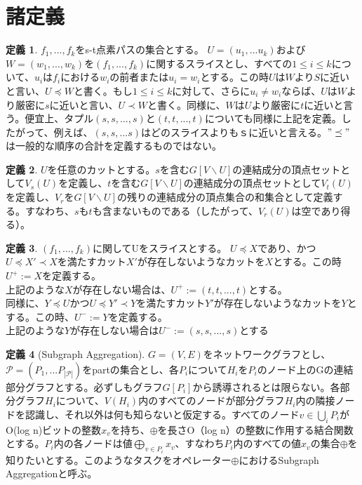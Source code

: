\documentclass{jarticle}
\theoremstyle{definition}
\newtheorem{definition}{定義}
\begin{document}
\section*{諸定義}
\begin{definition}
  ${f_1,...,f_k}$をs-t点素パスの集合とする。
  $U=(u_1,...u_k)$および$W=(w_1,...,w_k)$を$(f_1,...,f_k)$に関するスライスとし、すべての$1\leq i\leq k$について、$u_i$は$f_i$における$w_i$の前者または$u_i=w_i$とする。この時$U$は$W$より$S$に近いと言い、$U\preceq W$と書く。もし$1 \leq i \leq k$に対して、さらに$u_i \neq w_i$ならば、$U$は$W$より厳密に$s$に近いと言い、$U \prec W$と書く。同様に、$W$は$U$より厳密に$t$に近いと言う。便宜上、タプル$(s,s,...,s)$と$(t,t,...,t)$についても同様に上記を定義。したがって、例えば、$(s,s,...s)$はどのスライスよりもｓに近いと言える。$"\preceq"$は一般的な順序の合計を定義するものではない。
\end{definition}

\begin{definition}
  $U$を任意のカットとする。$s$を含む$G [V\backslash U]$の連結成分の頂点セットとして$V_s(U)$を定義し、$t$を含む$G[V\backslash U]$の連結成分の頂点セットとして$V_t(U)$を定義し、$V_r$を$G[V \backslash U]$の残りの連結成分の頂点集合の和集合として定義する。すなわち、$s$も$t$も含まないものである（したがって、$V_r(U)$は空であり得る）。
\end{definition}

\begin{definition}
  $(f_1,...,f_k)$に関してUをスライスとする。
  $U\preceq X$であり、かつ$U\preceq X'\prec X$を満たすカット$X'$が存在しないようなカットを$X$とする。この時$U^+:=X$を定義する。\\
  上記のような$X$が存在しない場合は、$U^+:=(t,t,...,t)$とする。\\
  同様に、$Y\preceq U$かつ$U\preceq Y'\prec Y$を満たすカット$Y'$が存在しないようなカットを$Y$とする。この時、$U^-:=Y$を定義する。\\
  上記のような$Y$が存在しない場合は$U^-:=(s,s,...,s)$とする 
\end{definition}

\begin{definition}[Subgraph Aggregation]
  $G=(V,E)$をネットワークグラフとし、$\mathcal{P} =(P_1,...P_{|\mathcal{P}|})$をpartの集合とし、各$P_i$について$H_i$を$P_i$のノード上のGの連結部分グラフとする。必ずしもグラフ$G[P_i]$から誘導されるとは限らない。各部分グラフ$H_i$について、$V(H_i)$内のすべてのノードが部分グラフ$H_i$内の隣接ノードを認識し、それ以外は何も知らないと仮定する。すべてのノード$v\in \bigcup_iP_i$がO(log n)ビットの整数$x_v$を持ち、$\oplus$を長さO（log n）の整数に作用する結合関数とする。$P_i$内の各ノードは値$\bigoplus_{v\in P_i}x_v$、すなわち$P_i$内のすべての値$x_v$の集合$\oplus$を知りたいとする。このようなタスクをオペレーター$\oplus$におけるSubgraph Aggregationと呼ぶ。
\end{definition}
\end{document}

